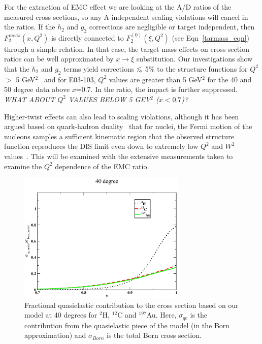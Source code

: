For the extraction of EMC effect we are looking at the A/D ratios of the
measured cross sections, so any A-independent scaling violations will cancel
in the ratios. If the $h_2$ and $g_2$ corrections are negligible or target
independent, then $F_2^{meas}(x,Q^2)$ is directly connected to
$F_2^{(0)}(\xi,Q^2)$ (see Eqn~\ref{tarmass_eqn}) through a simple relation. In
that case, the target mass effects on cross section ratios can be well
approximated by $x\rightarrow \xi$ substitution. Our investigations show that
the $h_2$ and $g_2$ terms yield corrections $\ltorder$ 5\% to the structure
functions for $Q^2$ $>$ 5 GeV$^2$~\cite{nadia_f2prl} and for E03-103, $Q^2$
values are greater than 5 GeV$^2$ for the 40 and 50 degree data above $x$=0.7.
In the ratio, the impact is further suppressed.  \textit{WHAT ABOUT $Q^2$
VALUES BELOW 5 GEV$^2$ ($x<0.7$)?}

Higher-twist effects can also lead to scaling violations, although it has been
argued based on quark-hadron duality~\cite{niculescu00a, melnitchouk:2005zr}
that for nuclei, the Fermi motion of the nucleons samples a sufficient
kinematic region that the observed structure function reproduces the DIS limit
even down to extremely low $Q^2$ and $W^2$ values~\cite{Arrington:2003nt}. 
This will be examined with the extensive measurements taken
to examine the $Q^2$ dependence of the EMC ratio.



\begin{figure}[htb]
\begin{center}
\includegraphics[width=80mm,angle=0]{plots/qe_contri.eps}
\caption{Fractional quasielastic contribution to the cross section based on
our model at 40 degrees for $^2$H, $^{12}$C and $^{197}$Au. Here,
$\sigma_{qe}$ is the contribution from the quasielastic piece of the model
(in the Born approximation) and $\sigma_{Born}$ is the total Born cross section.
\label{qe_contri_fig}}
\end{center}
\end{figure}

